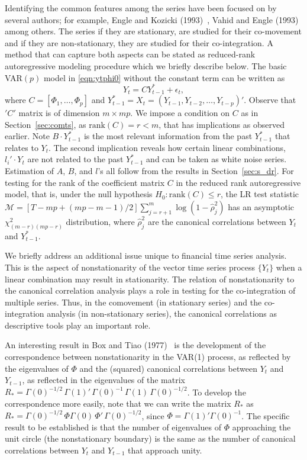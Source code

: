 Identifying the common features among the series have been focused on by several authors; for example, Engle and Kozicki (1993)~\cite{koz93}, Vahid and Engle (1993)~\cite{vah93} among others. The series if they are stationary, are studied for their co-movement and if they are non-stationary, they are studied for their co-integration. A method that can capture both aspects can be stated as reduced-rank autoregressive modeling procedure which we briefly describe below. The basic VAR$(p)$ model in \eqref{eqn:ytphi0} without the constant term can be written as
	\begin{equation} \label{eqn:2ytcyt}
	Y_t = CY_{t-1}^*+\epsilon_t,
	\end{equation}
where $C=[\Phi_1, \ldots, \Phi_p]$ and $Y_{t-1}^*= X_t= (Y_{t-1}, Y_{t-2}, \ldots, Y_{t-p})'$. Observe that $'C'$ matrix is of dimension $m \times mp$. We impose a condition on $C$ as in Section~\ref{sec:comts}, as $\text{rank}(C)= r < m$, that has implications as observed earlier. Note $B \cdot Y_{t-1}^*$ is the most relevant information from the past $Y_{t-1}^*$ that relates to $Y_t$. The second implication reveals how certain linear combinations, $l_i' \cdot Y_t$ are not related to the past $Y_{t-1}^*$ and can be taken as white noise series. Estimation of $A$, $B$, and $l$'s all follow from the results in Section~\ref{sec:s_dr}. For testing for the rank of the coefficient matrix $C$ in the reduced rank autoregressive  model, that is, under the null hypothesis $H_0: \text{rank}(C) \leq r$, the LR test statistic ${\mathcal{M}} = [T - mp + (mp - m - 1)/2] \sum_{j= r + 1}^{m} \log(1 - \hat{\rho}_{j}^{2} )$ has an asymptotic $\chi_{(m-r)(mp-r)}^{2}$ distribution, where $\hat{\rho}_j^2$ are the canonical correlations between $Y_t$ and $Y_{t-1}^*$.


We briefly address an additional issue unique to financial time series analysis.  This is the aspect of nonstationarity of the vector time series process $\{Y_t\}$ when a linear combination may result in stationarity. The relation of nonstationarity to the canonical correlation analysis plays a role in testing for the co-integration of multiple series. Thus, in the comovement (in stationary series) and the co-integration analysis (in non-stationary series), the canonical correlations as descriptive tools play an important role.


An interesting result in Box and Tiao (1977)~\cite{box77} is the development of the correspondence between nonstationarity in the VAR(1) process, as reflected by the eigenvalues of $\Phi$ and the (squared) canonical correlations between $Y_t$ and $Y_{t-1}$, as reflected in the eigenvalues of the matrix $R_* = \Gamma(0)^{-1/2}\, \Gamma(1)' \, \Gamma(0)^{-1}\, \Gamma(1)\, \Gamma(0)^{-1/2}$. To develop the correspondence more easily, note that we can write the matrix $R_*$ as $R_* = \Gamma (0)^{-1/2}\, \Phi \Gamma(0)\, \Phi' \, \Gamma(0)^{-1/2}$, since $\Phi = \Gamma(1)' \Gamma(0)^{-1}$. The specific result to be established is that the number of eigenvalues of $\Phi$ approaching the unit circle (the nonstationary boundary) is the same as the number of canonical correlations between $Y_t$ and $Y_{t-1}$ that approach unity.  


